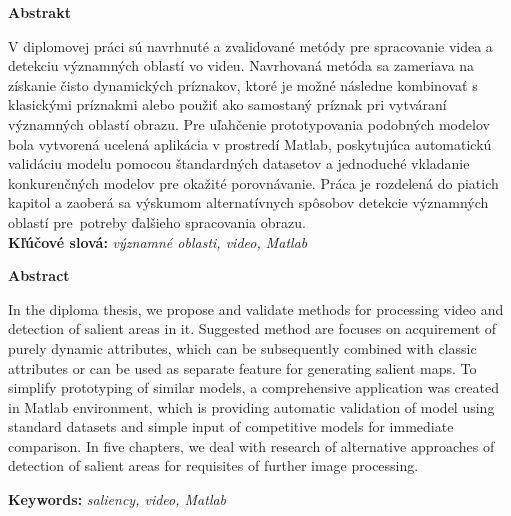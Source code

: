 {\noindent\large\bf Abstrakt}

\vspace{1.8cm}
V diplomovej práci sú navrhnuté a zvalidované metódy pre spracovanie videa a detekciu významných oblastí vo videu.
Navrhovaná metóda sa zameriava na získanie čisto dynamických príznakov, ktoré je možné následne kombinovať s klasickými príznakmi alebo použiť ako samostaný príznak pri vytváraní významných oblastí obrazu.
Pre uľahčenie prototypovania podobných modelov bola vytvorená ucelená aplikácia v prostredí Matlab, poskytujúca automatickú validáciu modelu pomocou štandardných datasetov a jednoduché vkladanie konkurenčných modelov pre okažité porovnávanie.
Práca je rozdelená do piatich kapitol a zaoberá sa výskumom alternatívnych spôsobov detekcie významných oblastí pre~potreby ďalšieho spracovania obrazu.
\\

{\parindent0pt \textbf{Kľúčové slová:} \emph{významné oblasti, video, Matlab}}

\newpage
 {\noindent\large\bf Abstract}
  \vspace{1.8cm}


In the diploma thesis, we propose and validate methods for processing video and detection of salient areas in it. Suggested method are focuses on acquirement of purely dynamic attributes, which can be subsequently combined with classic attributes or can be used as separate feature for generating salient maps.
To simplify prototyping of similar models, a comprehensive application was created in Matlab environment, which is providing automatic validation of model using standard datasets and simple input of competitive models for immediate comparison.
In five chapters, we deal with research of alternative approaches of detection of salient areas for requisites of further image processing.

{\parindent0pt \textbf{Keywords:} \emph{saliency, video, Matlab}}


\newpage	
